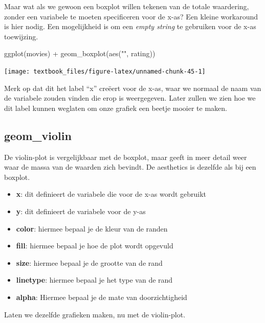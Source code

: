 \documentclass[]{tufte-book}
\newenvironment{Shaded}{}{}
\newcommand{\FunctionTok}[1]{\textcolor[rgb]{0.02,0.16,0.49}{#1}}
\newcommand{\NormalTok}[1]{#1}
\newcommand{\SpecialCharTok}[1]{\textcolor[rgb]{0.25,0.44,0.63}{#1}}
\newcommand{\StringTok}[1]{\textcolor[rgb]{0.25,0.44,0.63}{#1}}
\providecommand{\tightlist}{%
  \setlength{\itemsep}{0pt}\setlength{\parskip}{0pt}}
\begin{document}
Maar wat als we gewoon een boxplot willen tekenen van de totale waardering, zonder een variabele te moeten specificeren voor de x-as? Een kleine workaround is hier nodig. Een mogelijkheid is om een \emph{empty string} te gebruiken voor de x-as toewijzing.

\begin{Shaded}
\begin{Highlighting}[]
\FunctionTok{ggplot}\NormalTok{(movies) }\SpecialCharTok{+}
  \FunctionTok{geom\_boxplot}\NormalTok{(}\FunctionTok{aes}\NormalTok{(}\StringTok{""}\NormalTok{, rating))}
\end{Highlighting}
\end{Shaded}

\texttt{[image: textbook\_files/figure-latex/unnamed-chunk-45-1]}

Merk op dat dit het label ``x'' creëert voor de x-as, waar we normaal de naam van de variabele zouden vinden die erop is weergegeven. Later zullen we zien hoe we dit label kunnen weglaten om onze grafiek een beetje mooier te maken.

\hypertarget{geom_violin}{%
\subsection{geom\_violin}\label{geom_violin}}

De violin-plot is vergelijkbaar met de boxplot, maar geeft in meer detail weer waar de massa van de waarden zich bevindt. De aesthetics is dezelfde als bij een boxplot.

\begin{itemize}
\tightlist
\item
  \textbf{x}: dit definieert de variabele die voor de x-as wordt gebruikt
\item
  \textbf{y}: dit definieert de variabele voor de y-as
\item
  \textbf{color}: hiermee bepaal je de kleur van de randen
\item
  \textbf{fill}: hiermee bepaal je hoe de plot wordt opgevuld
\item
  \textbf{size}: hiermee bepaal je de grootte van de rand
\item
  \textbf{linetype}: hiermee bepaal je het type van de rand
\item
  \textbf{alpha}: Hiermee bepaal je de mate van doorzichtigheid
\end{itemize}

Laten we dezelfde grafieken maken, nu met de violin-plot.
\end{document}
